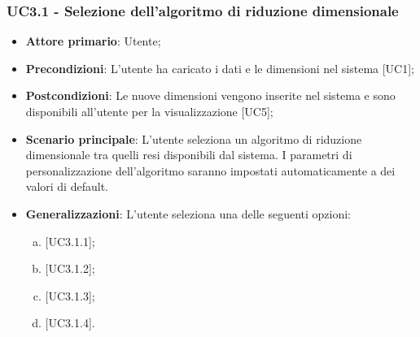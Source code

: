\subsubsection{UC3.1 - Selezione dell'algoritmo di riduzione dimensionale}
\begin{itemize}
	\item \textbf{Attore primario}: Utente;
	\item \textbf{Precondizioni}: L'utente ha caricato i dati e le dimensioni nel sistema [UC1];
	\item \textbf{Postcondizioni}: Le nuove dimensioni vengono inserite nel sistema e sono disponibili all'utente per la visualizzazione [UC5];
	\item \textbf{Scenario principale}: L'utente seleziona un algoritmo di riduzione dimensionale tra quelli resi disponibili dal sistema. I parametri di personalizzazione dell'algoritmo saranno impostati automaticamente a dei valori di default.
	\item \textbf{Generalizzazioni}: L'utente seleziona una delle seguenti opzioni:
	\begin{enumerate}[(a)]
		\item {} [UC3.1.1];
		\item {} [UC3.1.2];
		\item {} [UC3.1.3];
		\item {} [UC3.1.4].
	\end{enumerate}
\end{itemize}